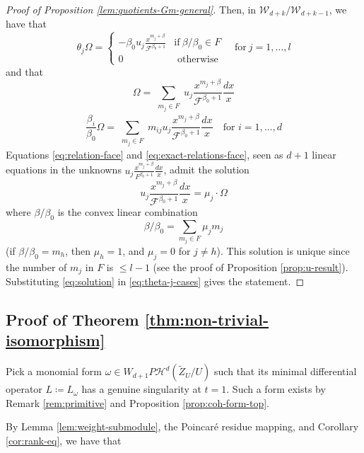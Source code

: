 \documentclass[11pt, reqno]{amsart}
\theoremstyle{plain}
\theoremstyle{definition}
\begin{document}
\begin{proof}[Proof of Proposition \ref{lem:quotients-Gm-general}]
Then, in $\mathscr{W}_{d+k}/\mathscr{W}_{d+k-1}$, we have that
\begin{equation}
\label{eq:theta-j-cases}
   \theta_j \Omega = \begin{cases}
        -\beta_0 u_j\frac{x^{m_{j}+\beta}}{\mathcal{F}^{\beta_0+1}} & \text{if}   \ \beta/\beta_0 \in F\\
      0 & \text{ otherwise}
  \end{cases} \quad \text{for} \ j=1, \dots, l
\end{equation}
and that
\begin{equation}
\label{eq:relation-face}
    \Omega=\sum_{\substack{m_{j} \in F}}  u_j \frac{x^{m_{j}+\beta} }{{\mathcal{F}}^{\beta_0+1}}\frac{dx}{x} 
\end{equation}
\begin{equation}
    \label{eq:exact-relations-face}
     \frac{\beta_i}{\beta_0} \Omega = \sum_{\substack{m_{j} \in F}}  m_{ij} u_j \frac{x^{m_{j}+\beta}} {\mathcal{F}^{\beta_0+1}}\frac{dx}{x} \quad \text{for } i=1,\dots,d 
\end{equation}
Equations \eqref{eq:relation-face} and \eqref{eq:exact-relations-face}, seen as $d+1$ linear equations in the unknowns $u_j \frac{x^{m_{j}+\beta} }{{F}^{\beta_0+1}}\frac{dx}{x}$, admit the solution 
\begin{equation}
\label{eq:solution}
u_j\frac{x^{m_{j}+\beta} }{{\mathcal{F}}^{\beta_0+1}}\frac{dx}{x}=\mu_j \cdot \Omega
\end{equation}
where $\beta/\beta_0$ is the convex linear combination \[ 
\beta/\beta_0=\sum_{m_j \in F} \mu_j m_j\] (if $\beta/\beta_0=m_h$, then $\mu_h=1$, and $\mu_j=0$ for $j \neq h$). 
This solution is unique since the number of $m_j$ in $F$ is $\leq l-1$ (see the proof of Proposition \ref{prop:u-result}).
Substituting \eqref{eq:solution} in  \eqref{eq:theta-j-cases} gives the statement. 
\end{proof}


\subsection{Proof of Theorem \ref{thm:non-trivial-isomorphism}} \label{sec:3}
Pick a monomial form $\omega \in {W}_{d+1} P\mathcal{H}^d(\widetilde{Z}_U/U)$ such that its minimal differential operator $L\coloneqq L_{\omega}$ has a genuine singularity at $t=1$. Such a form exists by Remark \ref{rem:primitive} and Proposition \ref{prop:coh-form-top}.


By Lemma \ref{lem:weight-submodule}, the Poincar\'e residue mapping, and Corollary \ref{cor:rank-eq}, we have that
\end{document}
